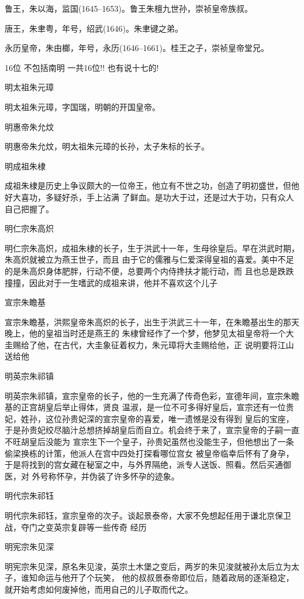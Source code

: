 \documentclass[11pt,a4paper,onecolumn]{article}
\begin{document}
鲁王，朱以海，监国(1645--1653)。鲁王朱檀九世孙，崇祯皇帝族叔。

唐王，朱聿粤，年号，绍武(1646)。朱聿键之弟。

永历皇帝，朱由榔，年号，永历(1646--1661)。桂王之子，崇祯皇帝堂兄。



16位 不包括南明 一共16位!! 也有说十七的!

明太祖朱元璋

明太祖朱元璋，字国瑞，明朝的开国皇帝。

明惠帝朱允炆

明惠帝朱允炆，明太祖朱元璋的长孙，太子朱标的长子。

明成祖朱棣

成祖朱棣是历史上争议颇大的一位帝王，他立有不世之功，创造了明初盛世，但他好大喜功，多疑好杀，手上沾满
了鲜血。是功大于过，还是过大于功，只有众人自己把握了。

明仁宗朱高炽

明仁宗朱高炽，成祖朱棣的长子，生于洪武十一年，生母徐皇后。早在洪武时期，朱高炽就被立为燕王世子，而且
由于它的儒雅与仁爱深得皇祖的喜爱。美中不足的是朱高炽身体肥胖，行动不便，总要两个内侍搀扶才能行动，而
且也总是跌跌撞撞，因此对于一生嗜武的成祖来讲，他并不喜欢这个儿子

宣宗朱瞻基

宣宗朱瞻基，洪熙皇帝朱高炽的长子，出生于洪武三十一年，在朱瞻基出生的那天晚上，他的皇祖当时还是燕王的
朱棣曾经作了一个梦，他梦见太祖皇帝将一个大圭赐给了他，在古代，大圭象征着权力，朱元璋将大圭赐给他，正
说明要将江山送给他

明英宗朱祁镇

明英宗朱祁镇，宣宗皇帝的长子，他的一生充满了传奇色彩，宣德年间，宣宗朱瞻基的正宫胡皇后举止得体，贤良
温淑，是一位不可多得好皇后，宣宗还有一位贵妃，姓孙，这位孙贵妃深的宣宗皇帝的喜爱，唯一遗憾是没有得到
皇后的宝座，于是孙贵妃绞尽脑汁总想挤掉胡皇后而自立。机会终于来了，宣宗皇帝的子嗣一直不旺胡皇后没能为
宣宗生下一个皇子，孙贵妃虽然也没能生子，但他想出了一条偷梁换栋的计策，他派人在宫中四处打探看哪位宫女
被皇帝临幸后怀有了身孕，于是将找到的宫女藏在秘室之中，与外界隔绝，派专人送饭、照看。然后买通御医，对
外号称怀孕，并伪装了许多怀孕的迹象。

明代宗朱祁钰

明代宗朱祁钰，宣宗皇帝的次子。谈起景泰帝，大家不免想起任用于谦北京保卫战，夺门之变英宗复辟等一些传奇
经历

明宪宗朱见深

明宪宗朱见深，原名朱见浚，英宗土木堡之变后，两岁的朱见浚就被孙太后立为太子，谁知命运与他开了个玩笑，
他的叔叔景泰帝即位后，随着政局的逐渐稳定，就开始考虑如何废掉他，而用自己的儿子取而代之。
\end{document}
